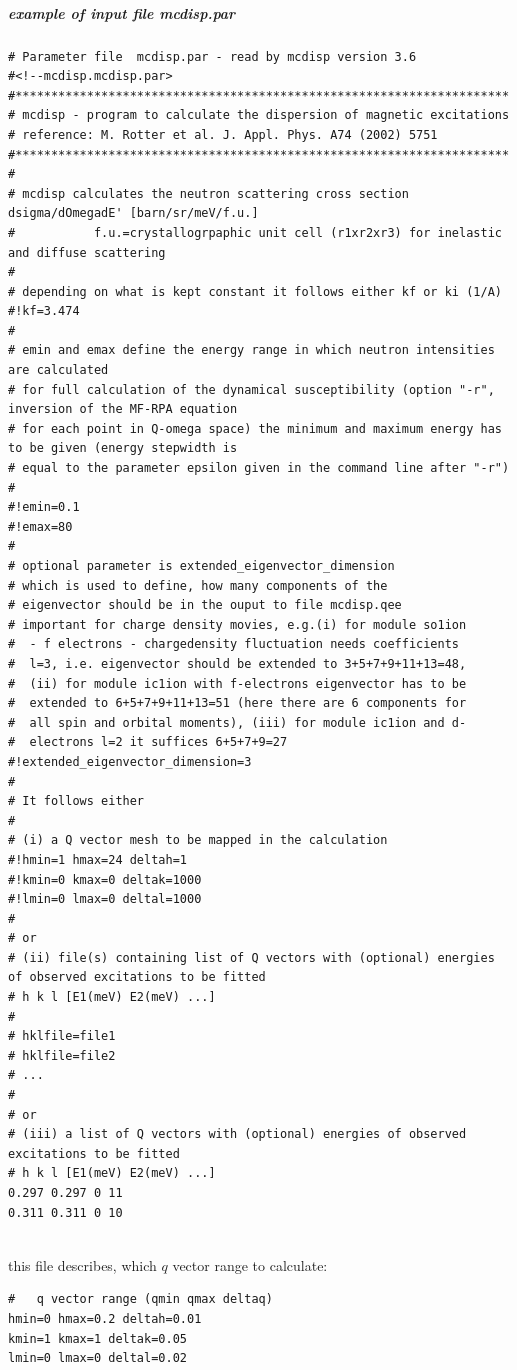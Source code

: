 \subparagraph{example of input file {\prg mcdisp.par}}

{\footnotesize
\begin{verbatim}
# Parameter file  mcdisp.par - read by mcdisp version 3.6
#<!--mcdisp.mcdisp.par>
#*********************************************************************
# mcdisp - program to calculate the dispersion of magnetic excitations
# reference: M. Rotter et al. J. Appl. Phys. A74 (2002) 5751
#*********************************************************************
#
# mcdisp calculates the neutron scattering cross section dsigma/dOmegadE' [barn/sr/meV/f.u.]
#           f.u.=crystallogrpaphic unit cell (r1xr2xr3) for inelastic and diffuse scattering
#
# depending on what is kept constant it follows either kf or ki (1/A)
#!kf=3.474
# 
# emin and emax define the energy range in which neutron intensities are calculated
# for full calculation of the dynamical susceptibility (option "-r", inversion of the MF-RPA equation 
# for each point in Q-omega space) the minimum and maximum energy has to be given (energy stepwidth is 
# equal to the parameter epsilon given in the command line after "-r")
#
#!emin=0.1
#!emax=80
#
# optional parameter is extended_eigenvector_dimension
# which is used to define, how many components of the
# eigenvector should be in the ouput to file mcdisp.qee
# important for charge density movies, e.g.(i) for module so1ion
#  - f electrons - chargedensity fluctuation needs coefficients
#  l=3, i.e. eigenvector should be extended to 3+5+7+9+11+13=48,
#  (ii) for module ic1ion with f-electrons eigenvector has to be
#  extended to 6+5+7+9+11+13=51 (here there are 6 components for 
#  all spin and orbital moments), (iii) for module ic1ion and d-
#  electrons l=2 it suffices 6+5+7+9=27 
#!extended_eigenvector_dimension=3
#
# It follows either 
#
# (i) a Q vector mesh to be mapped in the calculation
#!hmin=1 hmax=24 deltah=1
#!kmin=0 kmax=0 deltak=1000
#!lmin=0 lmax=0 deltal=1000
#
# or 
# (ii) file(s) containing list of Q vectors with (optional) energies of observed excitations to be fitted
# h k l [E1(meV) E2(meV) ...]
#
# hklfile=file1
# hklfile=file2
# ...
#
# or
# (iii) a list of Q vectors with (optional) energies of observed excitations to be fitted
# h k l [E1(meV) E2(meV) ...]
0.297 0.297 0 11 
0.311 0.311 0 10 


\end{verbatim}
}

this file describes, which $q$ vector range to
calculate:

\begin{verbatim}
#   q vector range (qmin qmax deltaq)
hmin=0 hmax=0.2 deltah=0.01
kmin=1 kmax=1 deltak=0.05
lmin=0 lmax=0 deltal=0.02
\end{verbatim}

